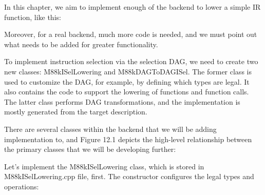 In this chapter, we aim to implement enough of the backend to lower a simple IR function, like this:


Moreover, for a real backend, much more code is needed, and we must point out what needs to be added for greater functionality.

To implement instruction selection via the selection DAG, we need to create two new classes: M88kISelLowering and M88kDAGToDAGISel. The former class is used to customize the DAG, for example, by defining which types are legal. It also contains the code to support the lowering of functions and function calls. The latter class performs DAG transformations, and the implementation is mostly generated from the target description.

There are several classes within the backend that we will be adding implementation to, and Figure 12.1 depicts the high-level relationship between the primary classes that we will be developing further:



Let’s implement the M88kISelLowering class, which is stored in M88kISelLowering.cpp file, first. The constructor configures the legal types and operations:

